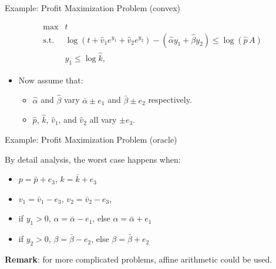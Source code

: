 \documentclass[10pt,ignorenonframetext,serif,onlymath]{beamer}
\providecommand{\tightlist}{%
  \setlength{\itemsep}{0pt}\setlength{\parskip}{0pt}}
\begin{document}
\begin{frame}{Example: Profit Maximization Problem (convex)}
\protect\hypertarget{sec:example-profit-maximization-problem-convex}{}

\[\begin{array}{ll}
\text{max}  & t \\
\text{s.t.} & \log(t + \hat{v}_1 e^{y_1} + \hat{v}_2 e^{y_2}) - (\hat{\alpha} y_1 + \hat{\beta} y_2) \le \log(\hat{p}\,A)  \\
                  & y_1 \le \log \hat{k} ,
\end{array}\]

\begin{itemize}
\tightlist
\item
  Now assume that:

  \begin{itemize}
  \tightlist
  \item
    \(\hat{\alpha}\) and \(\hat{\beta}\) vary \(\bar{\alpha} \pm e_1\)
    and \(\bar{\beta} \pm e_2\) respectively.
  \item
    \(\hat{p}\), \(\hat{k}\), \(\hat{v}_1\), and \(\hat{v}_2\) all vary
    \(\pm e_3\).
  \end{itemize}
\end{itemize}

\end{frame}

\begin{frame}{Example: Profit Maximization Problem (oracle)}
\protect\hypertarget{sec:example-profit-maximization-problem-oracle}{}

By detail analysis, the worst case happens when:

\begin{itemize}
\tightlist
\item
  \(p = \bar{p} + e_3\), \(k = \bar{k} + e_3\)
\item
  \(v_1 = \bar{v}_1 - e_3\), \(v_2 = \bar{v}_2 - e_3\),
\item
  if \(y_1 > 0\), \(\alpha = \bar{\alpha} - e_1\), else
  \(\alpha = \bar{\alpha} + e_1\)
\item
  if \(y_2 > 0\), \(\beta = \bar{\beta} - e_2\), else
  \(\beta = \bar{\beta} + e_2\)
\end{itemize}

\textbf{Remark}: for more complicated problems, affine arithmetic could
be used.

\end{frame}
\end{document}
